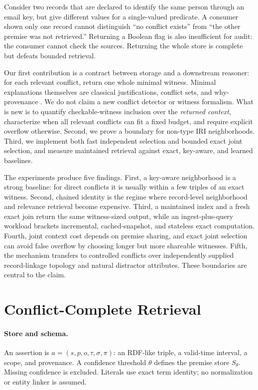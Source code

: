 \documentclass[letterpaper]{article} %
\begin{document}
Consider two records that are declared to identify the same person through an
email key, but give different values for a single-valued predicate.  A consumer
shown only one record cannot distinguish ``no conflict exists'' from ``the
other premise was not retrieved.''  Returning a Boolean flag is also
insufficient for audit: the consumer cannot check the sources.  Returning the
whole store is complete but defeats bounded retrieval.

Our first contribution is a contract between storage and a downstream
reasoner: for each relevant conflict, return one whole minimal witness.
Minimal
explanations themselves are classical justifications, conflict sets, and
why-provenance \citep{reiter1987diagnosis,kalyanpur2007justifications,
baader2010pinpointing,buneman2001whywhere,green2007semirings}.  We do not claim
a new conflict detector or witness formalism.  What is new is to quantify
checkable-witness inclusion over the \emph{returned context}, characterize
when all relevant conflicts can fit a fixed budget, and require explicit
overflow otherwise.  Second, we prove a boundary for non-type IRI
neighborhoods.
Third, we implement both fast independent selection and bounded exact joint
selection, and measure maintained retrieval against exact, key-aware, and
learned baselines.

The experiments produce five findings.  First, a key-aware neighborhood is a
strong baseline: for direct conflicts it is usually within a few triples of an
exact witness.  Second, chained identity is the regime where record-level
neighborhood and relevance retrieval become expensive.  Third, a maintained
index and a fresh exact join return the same witness-sized output, while an
ingest-plus-query workload brackets incremental, cached-snapshot, and
stateless exact computation.  Fourth,
joint context cost depends on premise sharing, and exact joint selection can
avoid false overflow by choosing longer but more shareable witnesses.  Fifth,
the mechanism transfers to controlled conflicts over independently supplied
record-linkage topology and natural distractor attributes.  These boundaries
are central to the claim.

\section{Conflict-Complete Retrieval}
\label{sec:model}

\paragraph{Store and schema.}
An assertion is
$a=(s,p,o,\tau,\sigma,\pi)$: an RDF-like triple, a valid-time interval,
a scope, and provenance.  A confidence threshold $\theta$ defines the premise
store $S_\theta$.  Missing confidence is excluded.  Literals use exact term
identity; no normalization or entity linker is assumed.
\end{document}

